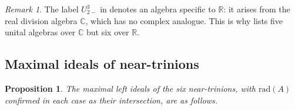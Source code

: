 \documentclass{amsart}
\theoremstyle{plain}
\newtheorem{proposition}[theorem]{Proposition}
\theoremstyle{definition}
\theoremstyle{remark}
\newtheorem{remark}[theorem]{Remark}
\newcommand{\RR}{\mathbb{R}}
\newcommand{\CC}{\mathbb{C}}
\newcommand{\Jac}{\mathrm{rad}}
\begin{document}
\begin{remark}
  The label $U^3_{2-}$ in \cite{Kobayashi2021} denotes an algebra
  specific to $\RR$: it arises from the real division algebra $\CC$,
  which has no complex analogue.
  This is why \cite{Kobayashi2021} lists five unital algebras over $\CC$
  but six over $\RR$.
\end{remark}

\subsection{Maximal ideals of near-trinions}
\label{sec:maxideals}

\begin{proposition}\label{prop:maxideals}
  The maximal left ideals of the six near-trinions, with $\Jac(A)$
  confirmed in each case as their intersection, are as follows.
\end{proposition}
\end{document}
